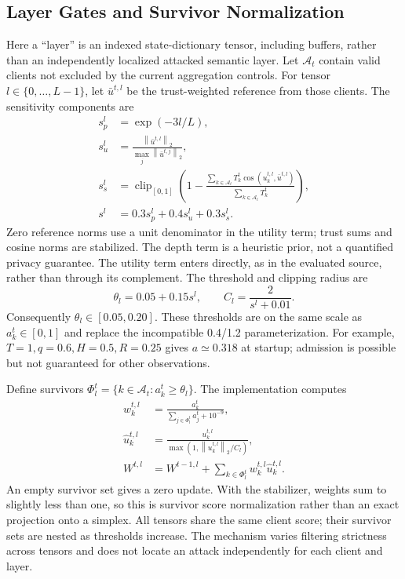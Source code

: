\documentclass[conference,compsoc]{IEEEtran}
\newcommand{\clip}{\operatorname{clip}_{[0,1]}}
\newcommand{\norm}[1]{\left\lVert#1\right\rVert_2}
\begin{document}
\subsection{Layer Gates and Survivor Normalization}
Here a ``layer'' is an indexed state-dictionary tensor, including buffers, rather than an independently localized attacked semantic layer. Let $\mathcal A_t$ contain valid clients not excluded by the current aggregation controls. For tensor $l\in\{0,\ldots,L-1\}$, let $\bar u^{t,l}$ be the trust-weighted reference from those clients. The sensitivity components are
\begin{align}
 s_p^l&=\exp(-3l/L),\\
 s_u^l&=\frac{\norm{\bar u^{t,l}}}{\max_j\norm{\bar u^{t,j}}},\\
 s_s^l&=\clip\!\left(1-\frac{\sum_{k\in\mathcal A_t}T_k^t\cos(u_k^{t,l},\bar u^{t,l})}{\sum_{k\in\mathcal A_t}T_k^t}\right),\\
 s^l&=0.3s_p^l+0.4s_u^l+0.3s_s^l.
\end{align}
Zero reference norms use a unit denominator in the utility term; trust sums and cosine norms are stabilized. The depth term is a heuristic prior, not a quantified privacy guarantee. The utility term enters directly, as in the evaluated source, rather than through its complement. The threshold and clipping radius are
\begin{equation}
 \theta_l=0.05+0.15s^l,\qquad C_l=\frac{2}{s^l+0.01}.
\end{equation}
Consequently $\theta_l\in[0.05,0.20]$. These thresholds are on the same scale as $a_k^t\in[0,1]$ and replace the incompatible 0.4/1.2 parameterization. For example, $T=1,q=0.6,H=0.5,R=0.25$ gives $a\simeq0.318$ at startup; admission is possible but not guaranteed for other observations.

Define survivors $\Phi_l^t=\{k\in\mathcal A_t:a_k^t\ge\theta_l\}$. The implementation computes
\begin{align}
 w_k^{t,l}&=\frac{a_k^t}{\sum_{j\in\Phi_l^t}a_j^t+10^{-9}},\\
 \widehat u_k^{t,l}&=\frac{u_k^{t,l}}{\max(1,\norm{u_k^{t,l}}/C_l)},\\
 W^{t,l}&=W^{t-1,l}+\sum_{k\in\Phi_l^t}w_k^{t,l}\widehat u_k^{t,l}.
\end{align}
An empty survivor set gives a zero update. With the stabilizer, weights sum to slightly less than one, so this is survivor score normalization rather than an exact projection onto a simplex. All tensors share the same client score; their survivor sets are nested as thresholds increase. The mechanism varies filtering strictness across tensors and does not locate an attack independently for each client and layer.
\end{document}

